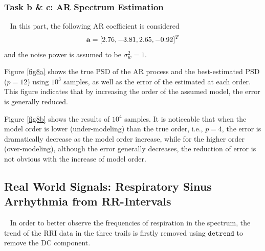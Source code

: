 \documentclass[10pt]{article}
\begin{document}
\subsubsection{Task b \& c: AR Spectrum Estimation}
\ \indent
In this part, the following AR coefficient is considered
\begin{equation}
	{\bf{a}} = [2.76,-3.81, 2.65,-0.92]^T \label{eq19}
\end{equation}
and the noise power is assumed to be $\sigma_w^2=1$.

Figure \ref{fig8a} shows the true PSD of the AR process and the best-estimated 
PSD ($p=12$) using $10^3$ samples, as well as the error of the estimated at 
each order. This figure indicates that by increasing the order of the 
assumed model, the error is generally reduced.

Figure \ref{fig8b} shows the results of $10^4$ samples. It is noticeable that when 
the model order is lower (under-modeling) than the true order, i.e., $p=4$, 
the error is dramatically decrease as the model order increase, while for 
the higher order (over-modeling), although the error generally decreases, 
the reduction of error is not obvious with the increase of model order.

\subsection{Real World Signals: Respiratory Sinus Arrhythmia from RR-Intervals}
\ \indent
In order to better observe the frequencies of respiration in the spectrum, 
the trend of the RRI data in the three trails is firstly removed using 
$\mathtt{detrend}$ to remove the DC component.
\end{document}
